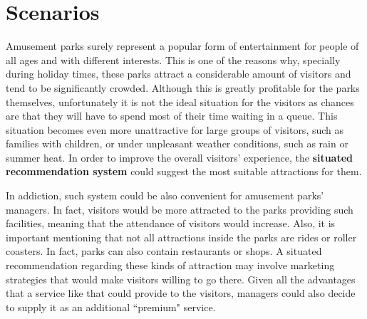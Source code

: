 \section{Scenarios}\label{sec:scenarios}

Amusement parks surely represent a popular form of entertainment for people of all ages and with different interests.
This is one of the reasons why, specially during holiday times, these parks attract a considerable amount of visitors and tend to be significantly crowded.
Although this is greatly profitable for the parks themselves, unfortunately it is not the ideal situation for the visitors as chances are that they will have to spend most of their time waiting in a queue.
This situation becomes even more unattractive for large groups of visitors, such as families with children, or under unpleasant weather conditions, such as rain or summer heat.
In order to improve the overall visitors' experience, the \textbf{situated recommendation system} could suggest the most suitable attractions for them.

In addiction, such system could be also convenient for amusement parks' managers.
In fact, visitors would be more attracted to the parks providing such facilities, meaning that the attendance of visitors would increase.
Also, it is important mentioning that not all attractions inside the parks are rides or roller coasters.
In fact, parks can also contain restaurants or shops.
A situated recommendation regarding these kinds of attraction may involve marketing strategies that would make visitors willing to go there.
Given all the advantages that a service like that could provide to the visitors, managers could also decide to supply it as an additional ``premium" service.